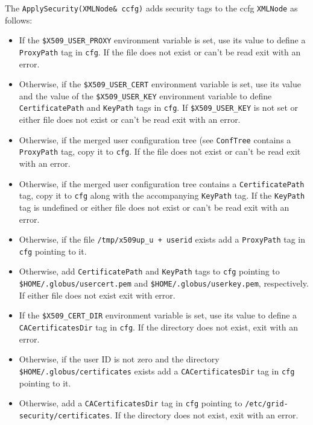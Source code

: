 \documentclass{book}
\newcommand{\XMLNode}{\texttt{XMLNode}}
\begin{document}
The \texttt{ApplySecurity(XMLNode\& ccfg)} adds security tags to the
ccfg {\XMLNode} as follows:

\begin{itemize}
\item{If the \texttt{\$X509\_USER\_PROXY} environment variable is set,
  use its value to define a \texttt{ProxyPath} tag in \texttt{cfg}. If
  the file does not exist or can't be read exit with an error.}
\item{Otherwise, if the \texttt{\$X509\_USER\_CERT} environment
  variable is set, use its value and the value of the
  \texttt{\$X509\_USER\_KEY} environment variable to define
  \texttt{CertificatePath} and \texttt{KeyPath} tags in \texttt{cfg}.
  If \texttt{\$X509\_USER\_KEY} is not set or either file does not
  exist or can't be read exit with an error.}
\item{Otherwise, if the merged user configuration tree (see
  \texttt{ConfTree} contains a \texttt{ProxyPath} tag, copy it to
  \texttt{cfg}. If the file does not exist or can't be read exit with
  an error.}
\item{Otherwise, if the merged user configuration tree contains a
  \texttt{CertificatePath} tag, copy it to \texttt{cfg} along with the
  accompanying \texttt{KeyPath} tag. If the \texttt{KeyPath} tag is
  undefined or either file does not exist or can't be read exit with
  an error.}
\item{Otherwise, if the file \texttt{/tmp/x509up\_u + userid} exists
  add a \texttt{ProxyPath} tag in \texttt{cfg} pointing to it.}
\item{Otherwise, add \texttt{CertificatePath} and \texttt{KeyPath}
  tags to \texttt{cfg} pointing to
  \texttt{\$HOME/.globus/usercert.pem} and
  \texttt{\$HOME/.globus/userkey.pem}, respectively. If either file
  does not exist exit with error.}
\item{If the \texttt{\$X509\_CERT\_DIR} environment variable is set,
  use its value to define a \texttt{CACertificatesDir} tag in
  \texttt{cfg}. If the directory does not exist, exit with an error.}
\item{Otherwise, if the user ID is not zero and the directory
  \texttt{\$HOME/.globus/certificates} exists add a
  \texttt{CACertificatesDir} tag in \texttt{cfg} pointing to it.}
\item{Otherwise, add a \texttt{CACertificatesDir} tag in \texttt{cfg}
  pointing to \texttt{/etc/grid-security/certificates}. If the
  directory does not exist, exit with an error.}
\end{itemize}
\end{document}
